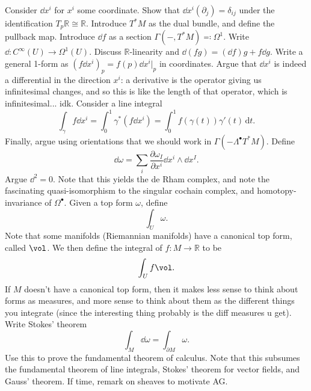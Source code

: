 Consider $\dd x^i$ for $x^i$ some coordinate. Show that $\dd x^i(\partial _j) = \delta _{ij} $ under the identification $T_p\mathbb{R} \cong \mathbb{R} $. Introduce $T^*M$ as the dual bundle, and define the pullback map. Introduce $\dd f$ as a section $\Gamma (-,T^*M) \eqqcolon \Omega ^1$. Write $\dd : C^\infty (U) \to \Omega ^1(U)$. Discuss $\mathbb{R} $-linearity and $\dd (fg) = (\dd f)g + f\dd g$. Write a general 1-form as $(f\dd x^i)_p = f(p)\dd x^i|_p$ in coordinates. Argue that $\dd x^i$ is indeed a differential in the direction $x^i$: a derivative is the operator giving us infinitesimal changes, and so this is like the length of that operator, which is infinitesimal... idk. Consider a line integral
\[
	\int_{\gamma } f\dd x^i = \int_{0}^{1} \gamma ^*(f \dd x^i) = \int_{0}^{1} f(\gamma (t))\gamma '(t) \,\mathrm{d} t 
.\]
Finally, argue using orientations that we should work in $\Gamma (-\Lambda ^{\bullet} T^*M)$. Define
\[
	\dd \omega = \sum_{i} \frac{\partial \omega _I}{\partial x^i} \dd x^i \wedge \dd x^I
.\]
Argue $\dd ^2=0$. Note that this yields the de Rham complex, and note the fascinating quasi-isomorphism to the singular cochain complex, and homotopy-invariance of $\Omega ^{\bullet} $. Given a top form $\omega $, define
\[
	\int_{U} \omega 
.\]
Note that some manifolds (Riemannian manifolds) have a canonical top form, called $\vol$. We then define the integral of $f : M \to \mathbb{R} $ to be
\[
	\int_{U} f \vol
.\]
If $M$ doesn't have a canonical top form, then it makes less sense to think about forms as measures, and more sense to think about them as the different things you integrate (since the interesting thing probably is the diff measures u get). Write Stokes' theorem
\[
	\int_{M} \dd \omega =\int_{\partial M} \omega 
.\]
Use this to prove the fundamental theorem of calculus. Note that this subsumes the fundamental theorem of line integrals, Stokes' theorem for vector fields, and Gauss' theorem. If time, remark on sheaves to motivate AG.

